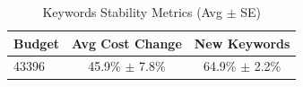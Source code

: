 \begin{table}[htbp]
\centering
\caption{Keywords Stability Metrics (Avg $\pm$ SE)}
\begin{tabular}{lcc}
\toprule
Budget & Avg Cost Change & New Keywords \\
\midrule
43396 & 45.9\% $\pm$ 7.8\% & 64.9\% $\pm$ 2.2\% \\
\bottomrule
\end{tabular}
\end{table}